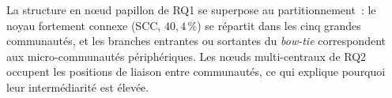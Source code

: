 La structure en n\oe{}ud papillon de RQ1 se superpose au partitionnement~: le noyau fortement connexe (SCC, $40{,}4\,\%$) se r\'epartit dans les cinq grandes communaut\'es, et les branches entrantes ou sortantes du \textit{bow-tie} correspondent aux micro-communaut\'es p\'eriph\'eriques. Les n\oe{}uds multi-centraux de RQ2 occupent les positions de liaison entre communaut\'es, ce qui explique pourquoi leur interm\'ediarit\'e est \'elev\'ee.
